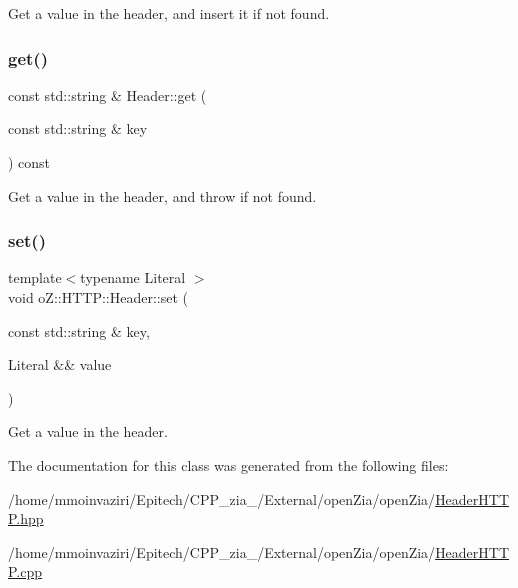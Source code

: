 Get a value in the header, and insert it if not found. 

\mbox{\label{classo_z_1_1_h_t_t_p_1_1_header_acb0cba9e469ca227411584a4d5485b91}} 
\subsubsection{\texorpdfstring{get()}{get()}\hspace{0.1cm}{\footnotesize\ttfamily [2/2]}}
{\footnotesize\ttfamily const std\+::string \& Header\+::get (\begin{DoxyParamCaption}\item[{const std\+::string \&}]{key }\end{DoxyParamCaption}) const}



Get a value in the header, and throw if not found. 

\mbox{\label{classo_z_1_1_h_t_t_p_1_1_header_a00466b7e626925b15b650733bab543f6}} 
\subsubsection{\texorpdfstring{set()}{set()}}
{\footnotesize\ttfamily template$<$typename Literal $>$ \\
void o\+Z\+::\+H\+T\+T\+P\+::\+Header\+::set (\begin{DoxyParamCaption}\item[{const std\+::string \&}]{key,  }\item[{Literal \&\&}]{value }\end{DoxyParamCaption})\hspace{0.3cm}{\ttfamily [inline]}}



Get a value in the header. 



The documentation for this class was generated from the following files\+:\begin{DoxyCompactItemize}
\item 
/home/mmoinvaziri/\+Epitech/\+C\+P\+P\+\_\+zia\+\_/\+External/open\+Zia/open\+Zia/\mbox{\hyperlink{_header_h_t_t_p_8hpp}{Header\+H\+T\+T\+P.\+hpp}}\item 
/home/mmoinvaziri/\+Epitech/\+C\+P\+P\+\_\+zia\+\_/\+External/open\+Zia/open\+Zia/\mbox{\hyperlink{_header_h_t_t_p_8cpp}{Header\+H\+T\+T\+P.\+cpp}}\end{DoxyCompactItemize}
